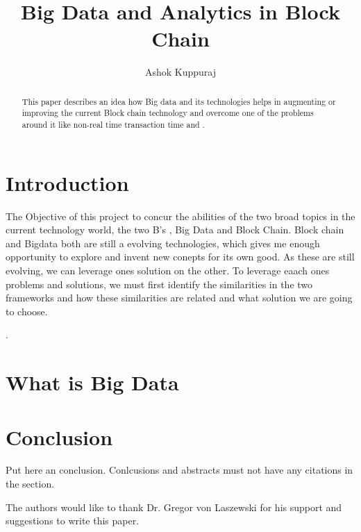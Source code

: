 \documentclass[sigconf]{acmart}
\begin{document}
\title{Big Data and Analytics in Block Chain}


\author{Ashok Kuppuraj}


\renewcommand{\shortauthors}{G. v. Laszewski}


\begin{abstract}
This paper describes an idea how Big data and its technologies helps in augmenting or improving the current Block chain technology and overcome one of the problems around it like non-real time transaction time and .
\end{abstract}



\maketitle

\section{Introduction}
The Objective of this project to concur the abilities of the two broad topics in the current technology world, the two B's , Big Data and Block Chain. Block chain and Bigdata both are still a evolving technologies, which gives me enough opportunity to explore and invent new conepts for its own good. As these are still evolving, we can leverage ones solution on the other.  To leverage eaach ones problems and solutions, we must first identify the similarities in the two frameworks and how these similarities are related and what solution we are going to choose. 

 \cite{editor00}.

\section{What is Big Data}


\section{Conclusion}

Put here an conclusion. Conlcusions and abstracts must not have any
citations in the section.


\begin{acks}

  The authors would like to thank Dr. Gregor von Laszewski for his
  support and suggestions to write this paper.

\end{acks}


 
\end{document}
